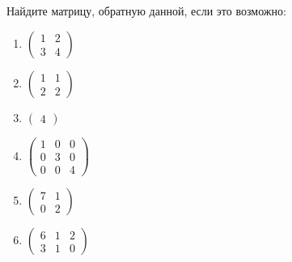 \documentclass[11pt, a4paper]{extarticle}
\begin{document}
\subsection{}
Найдите матрицу, обратную данной, если это возможно:
\begin{multicols}{3}
	\begin{enumerate}[label=\alph*)]
		\item $\begin{pmatrix}
		1 & 2 \\
		3 & 4
		\end{pmatrix}$
		\item $\begin{pmatrix}
		1 & 1 \\
		2 & 2
		\end{pmatrix}$
		\item $\begin{pmatrix}
		4
		\end{pmatrix}$
		\item $\begin{pmatrix}
		1 & 0 & 0 \\
		0 & 3 & 0 \\
		0 & 0 & 4 
		\end{pmatrix}$
		\item $\begin{pmatrix}
			7 & 1 \\
			0 & 2
		\end{pmatrix}$
		\item $\begin{pmatrix}
			6 & 1 & 2 \\
			3 & 1 & 0
		\end{pmatrix}$
	\end{enumerate}
\end{multicols}
\end{document}
